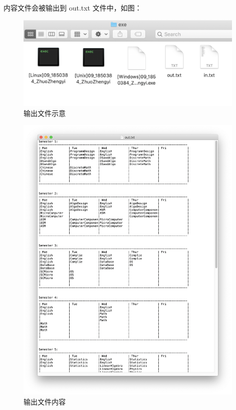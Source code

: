 内容文件会被输出到 out.txt 文件中，如图：

\begin{figure}[H]
    \centering
    \includegraphics[width=11cm]{src/output.png}
    \caption{输出文件示意}
\end{figure}

\begin{figure}[H]
    \centering
    \includegraphics[width=11cm]{src/outputContent.png}
    \caption{输出文件内容}
\end{figure}

